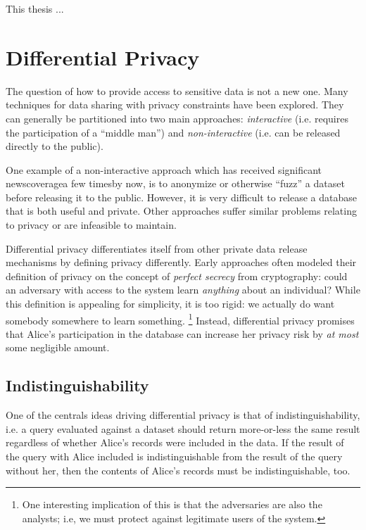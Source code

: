 \documentclass[12pt]{report}
\begin{document}
This thesis ...

\section{Differential Privacy}\label{sec:intro-diffpriv}

The question of how to provide access to sensitive data is not a new one.
Many techniques for data sharing with privacy constraints have been explored.
They can generally be partitioned into two main approaches: \textit{interactive} (i.e. requires the participation of a ``middle man'') and \textit{non-interactive} (i.e. can be released directly to the public).

One example of a non-interactive approach which has received significant news\footnotemark[\ref{fn:aol}] coverage\footnotemark[\ref{fn:twitter}] a few times\footnotemark[\ref{fn:netflix}] by now\footnotemark[\ref{fn:gic}], is to anonymize or otherwise ``fuzz'' a dataset before releasing it to the public.
However, it is very difficult to release a database that is both useful and private.
Other approaches suffer similar problems relating to privacy or are infeasible to maintain\cite{journals/cacm/Dwork11}.

Differential privacy differentiates itself from other private data release mechanisms by defining privacy differently.
Early approaches often modeled their definition of privacy on the concept of \textit{perfect secrecy} from cryptography: could an adversary with access to the system learn \textit{anything} about an individual?
While this definition is appealing for simplicity, it is too rigid: we actually do want somebody somewhere to learn something.
\footnote{One interesting implication of this is that the adversaries are also the analysts; i.e, we must protect against legitimate users of the system.}
Instead, differential privacy promises that Alice's participation in the database can increase her privacy risk by \textit{at most} some negligible amount.

\subsection{Indistinguishability}\label{subsec:intro-indistinguishability}

One of the centrals ideas driving differential privacy is that of indistinguishability, i.e. a query evaluated against a dataset should return more-or-less the same result regardless of whether Alice's records were included in the data.
If the result of the query with Alice included is indistinguishable from the result of the query without her, then the contents of Alice's records must be indistinguishable, too.
\end{document}
